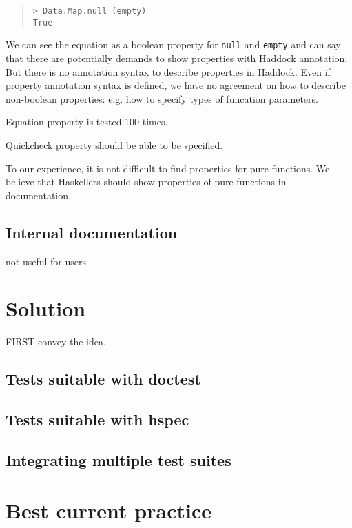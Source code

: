 \documentclass[preprint]{sigplanconf}
\begin{document}
\begin{quote}
\begin{verbatim}
> Data.Map.null (empty)
True
\end{verbatim}
\end{quote}

We can see the equation as a boolean property for {\tt null} and {\tt empty} and
can say that there are potentially demands to show properties with Haddock annotation.
But there is no annotation syntax to describe properties in Haddock.
Even if property annotation syntax is defined, 
we have no agreement on how to describe non-boolean properties: e.g. how to specify types of funcation parameters.

Equation property is tested 100 times.

Quickcheck property should be able to be specified.

To our experience, it is not difficult to find properties for pure functions.
We believe that Haskellers should show properties of pure functions
in documentation.

\subsection{Internal documentation}

not useful for users

\section{Solution}

FIRST convey the idea.

\subsection{Tests suitable with doctest}

\subsection{Tests suitable with hspec}

\subsection{Integrating multiple test suites}

\section{Best current practice}
\end{document}
